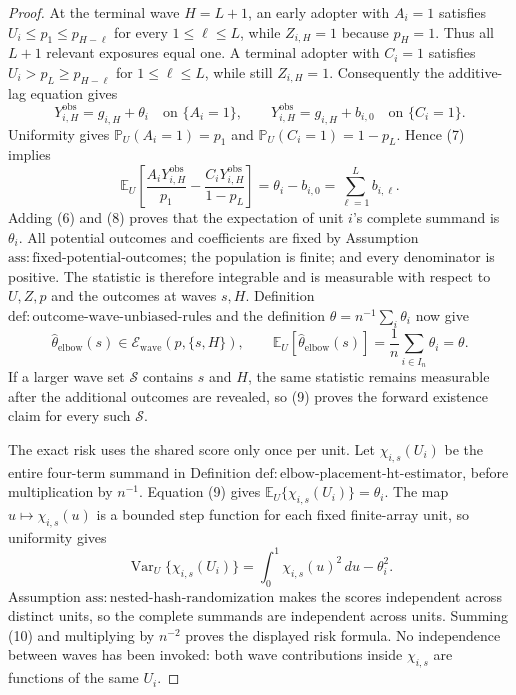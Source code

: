 \documentclass{article}
\begin{document}
\begin{proof}
At the terminal wave \(H=L+1\), an early adopter with \(A_i=1\) satisfies \(U_i\leq p_1\leq p_{H-\ell}\) for every \(1\leq\ell\leq L\), while \(Z_{i,H}=1\) because \(p_H=1\).  Thus all \(L+1\) relevant exposures equal one.  A terminal adopter with \(C_i=1\) satisfies \(U_i>p_L\geq p_{H-\ell}\) for \(1\leq\ell\leq L\), while still \(Z_{i,H}=1\).  Consequently the additive-lag equation gives
\[
 Y^{\mathrm{obs}}_{i,H}=g_{i,H}+\theta_i
 \quad\text{on }\{A_i=1\},
 \qquad
 Y^{\mathrm{obs}}_{i,H}=g_{i,H}+b_{i,0}
 \quad\text{on }\{C_i=1\}.
\tag{7}
\]
Uniformity gives \(\mathbb P_U(A_i=1)=p_1\) and \(\mathbb P_U(C_i=1)=1-p_L\).  Hence (7) implies
\[
 \mathbb E_U\!\left[
 \frac{A_iY^{\mathrm{obs}}_{i,H}}{p_1}
 -\frac{C_iY^{\mathrm{obs}}_{i,H}}{1-p_L}
 \right]
 =\theta_i-b_{i,0}
 =\sum_{\ell=1}^{L}b_{i,\ell}.
\tag{8}
\]
Adding (6) and (8) proves that the expectation of unit \(i\)'s complete summand is \(\theta_i\).  All potential outcomes and coefficients are fixed by Assumption \(\mathrm{ass:fixed\text{-}potential\text{-}outcomes}\); the population is finite; and every denominator is positive.  The statistic is therefore integrable and is measurable with respect to \(U,Z,p\) and the outcomes at waves \(s,H\).  Definition \(\mathrm{def:outcome\text{-}wave\text{-}unbiased\text{-}rules}\) and the definition \(\theta=n^{-1}\sum_i\theta_i\) now give
\[
 \widehat\theta_{\mathrm{elbow}}(s)
 \in\mathcal E_{\mathrm{wave}}(p,\{s,H\}),
 \qquad
 \mathbb E_U\!\left[\widehat\theta_{\mathrm{elbow}}(s)\right]
 =\frac1n\sum_{i\in I_n}\theta_i=\theta.
\tag{9}
\]
If a larger wave set \(\mathcal S\) contains \(s\) and \(H\), the same statistic remains measurable after the additional outcomes are revealed, so (9) proves the forward existence claim for every such \(\mathcal S\).

The exact risk uses the shared score only once per unit.  Let \(\chi_{i,s}(U_i)\) be the entire four-term summand in Definition \(\mathrm{def:elbow\text{-}placement\text{-}ht\text{-}estimator}\), before multiplication by \(n^{-1}\).  Equation (9) gives \(\mathbb E_U\{\chi_{i,s}(U_i)\}=\theta_i\).  The map \(u\mapsto\chi_{i,s}(u)\) is a bounded step function for each fixed finite-array unit, so uniformity gives
\[
 \operatorname{Var}_U\{\chi_{i,s}(U_i)\}
 =\int_0^1\chi_{i,s}(u)^2\,du-\theta_i^2.
\tag{10}
\]
Assumption \(\mathrm{ass:nested\text{-}hash\text{-}randomization}\) makes the scores independent across distinct units, so the complete summands are independent across units.  Summing (10) and multiplying by \(n^{-2}\) proves the displayed risk formula.  No independence between waves has been invoked: both wave contributions inside \(\chi_{i,s}\) are functions of the same \(U_i\).


\end{proof}
\end{document}
